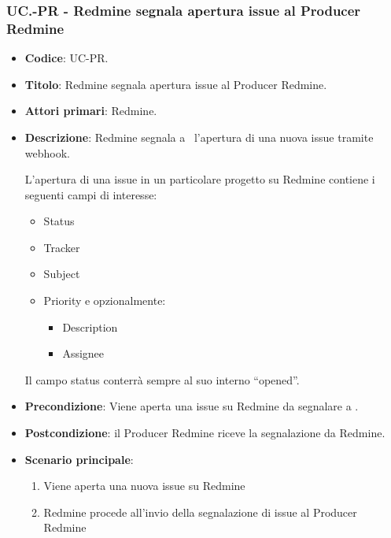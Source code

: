 \subsubsection{UC\theuccount.\thesubuccount-PR - Redmine segnala apertura issue al Producer Redmine}
\begin{itemize}
	\item \textbf{Codice}: UC\theuccount-PR.
	\item \textbf{Titolo}: Redmine segnala apertura issue al Producer Redmine.
	\item \textbf{Attori primari}: Redmine.
	\item \textbf{Descrizione}: Redmine segnala a \progetto\ l'apertura di una nuova issue tramite webhook.
	
	L'apertura di una issue in un particolare progetto su Redmine contiene i seguenti campi di interesse:
	\begin{itemize}
		\item Status
		\item Tracker
		\item Subject
		\item Priority e opzionalmente:
		\begin{itemize}
			\item Description
			\item Assignee
		\end{itemize}
	\end{itemize}
	Il campo status conterrà sempre al suo interno ``opened''.
	\item \textbf{Precondizione}: Viene aperta una issue su Redmine da
	segnalare a \progetto.
	\item \textbf{Postcondizione}: il Producer Redmine riceve la segnalazione da Redmine.
	\item \textbf{Scenario principale}: 
	\begin{enumerate}
		\item Viene aperta una nuova issue su Redmine
		\item Redmine procede all'invio della segnalazione di issue al Producer Redmine
	\end{enumerate}
	
\end{itemize}

